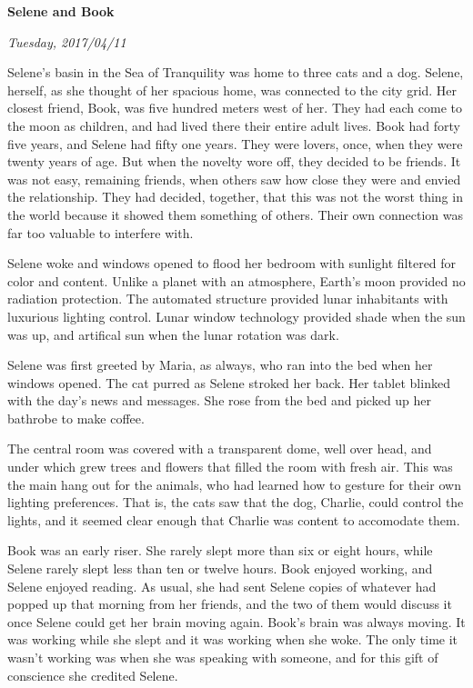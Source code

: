 

\centerline{\bf Selene and Book}
\centerline{\it Tuesday, 2017/04/11}

\vfill
\break

﻿Selene's basin in the Sea of Tranquility was home to three cats and a
dog.  Selene, herself, as she thought of her spacious home, was
connected to the city grid.  Her closest friend, Book, was five
hundred meters west of her.  They had each come to the moon as
children, and had lived there their entire adult lives.  Book had
forty five years, and Selene had fifty one years.  They were lovers,
once, when they were twenty years of age.  But when the novelty wore
off, they decided to be friends.  It was not easy, remaining friends,
when others saw how close they were and envied the relationship.  They
had decided, together, that this was not the worst thing in the world
because it showed them something of others.  Their own connection was
far too valuable to interfere with.

Selene woke and windows opened to flood her bedroom with sunlight
filtered for color and content.  Unlike a planet with an atmosphere,
Earth's moon provided no radiation protection.  The automated
structure provided lunar inhabitants with luxurious lighting control.
Lunar window technology provided shade when the sun was up, and
artifical sun when the lunar rotation was dark.

Selene was first greeted by Maria, as always, who ran into the bed
when her windows opened.  The cat purred as Selene stroked her back.
Her tablet blinked with the day's news and messages.  She rose from
the bed and picked up her bathrobe to make coffee.

The central room was covered with a transparent dome, well over head,
and under which grew trees and flowers that filled the room with fresh
air.  This was the main hang out for the animals, who had learned how
to gesture for their own lighting preferences.  That is, the cats saw
that the dog, Charlie, could control the lights, and it seemed clear
enough that Charlie was content to accomodate them.

Book was an early riser.  She rarely slept more than six or eight
hours, while Selene rarely slept less than ten or twelve hours.  Book
enjoyed working, and Selene enjoyed reading.  As usual, she had sent
Selene copies of whatever had popped up that morning from her friends,
and the two of them would discuss it once Selene could get her brain
moving again.  Book's brain was always moving.  It was working while
she slept and it was working when she woke.  The only time it wasn't
working was when she was speaking with someone, and for this gift of
conscience she credited Selene.

